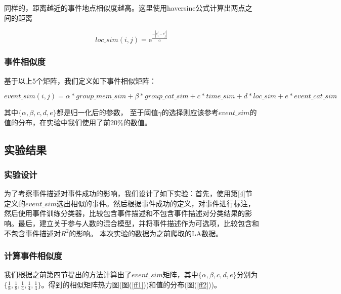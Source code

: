 同样的，距离越近的事件地点相似度越高。这里使用haversine公式计算出两点之间的距离

\[    
loc\_sim(i,j)=\mathrm{e}^\frac{-|e_i^l-e_j^l|}{\alpha}
\]

\subsubsection{事件相似度}
基于以上5个矩阵，我们定义如下事件相似矩阵：

\[    
event\_sim(i,j)=\alpha*group\_mem\_sim+\beta*group\_cat\_sim
+{c}*time\_sim+{d}*loc\_sim+{e}*event\_cat\_sim
\]

其中\(\{\alpha,\beta,{c},{d},{e}\}\)都是归一化后的参数，
至于阈值\(\gamma\)的选择则应该参考\(event\_sim\)的值的分布，在实验中我们使用了前20\%的数值。

\subsection{实验结果}

\subsubsection{实验设计}
为了考察事件描述对事件成功的影响，我们设计了如下实验：首先，使用第\ref{4}节定义的\(event\_sim\)选出相似的事件。然后根据事件成功的定义，对事件进行标注，然后使用事件训练分类器，比较包含事件描述和不包含事件描述对分类结果的影响。最后，建立关于参与人数的混合模型，并将事件描述作为可选项，比较包含和不包含事件描述对\(R^2\)的影响。
本次实验的数据为之前爬取的LA数据。

\subsubsection{计算事件相似度}
我们根据之前第四节提出的方法计算出了\(event\_sim\)矩阵，其中\(\{\alpha,\beta,{c},{d},{e}\}\)分别为\(\{\frac{1}{8},\frac{1}{8},\frac{1}{4},\frac{1}{4},\frac{1}{4}\}\)。得到的相似矩阵热力图(图(\ref{ff1}))和值的分布(图(\ref{ff2}))。

